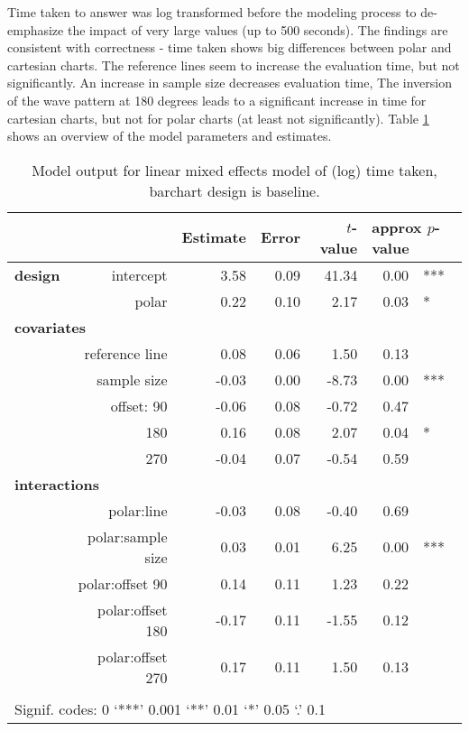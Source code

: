Time taken to answer was log transformed before the modeling process to de-emphasize the impact of very large values (up to 500 seconds). The findings are consistent with correctness - time taken shows big differences between polar and cartesian charts. 
The reference lines seem to increase the evaluation time, but not significantly. An increase in sample size decreases evaluation time, The inversion of the wave pattern at 180 degrees leads to a significant increase in time for cartesian charts, but not for polar charts (at least not significantly). Table \ref{tbl:time} shows an overview of the model parameters and estimates.

\begin{table}[ht]
\begin{center}
\resizebox{\linewidth}{!} {
\begin{tabular}{lrrrrrl}
  \hline
& & Estimate & Error & $t$-value & \multicolumn{2}{l}{approx $p$-value} \\   \hline
\bf design & intercept & 3.58 & 0.09 & 41.34 & 0.00 & ***\\ 
&  polar & 0.22 & 0.10 & 2.17 & 0.03 & * \\ [2pt]
\multicolumn{2}{l}{\bf covariates}\\
&reference line & 0.08 & 0.06 & 1.50 & 0.13 \\ [1pt]
 & sample size & -0.03 & 0.00 & -8.73 & 0.00 & ***\\ [1pt]
&  offset: 90 & -0.06 & 0.08 & -0.72 & 0.47 \\ 
& 180 & 0.16 & 0.08 & 2.07 & 0.04 & *\\ 
&  270 & -0.04 & 0.07 & -0.54 & 0.59 \\ [2pt]
\multicolumn{2}{l}{\bf interactions}\\
&  polar:line & -0.03 & 0.08 & -0.40 & 0.69 \\ [1pt]
&    polar:sample size & 0.03 & 0.01 & 6.25 & 0.00 & ***\\ [1pt]
&    polar:offset 90 & 0.14 & 0.11 & 1.23 & 0.22 \\ 
&    polar:offset 180 & -0.17 & 0.11 & -1.55 & 0.12 \\ 
&    polar:offset 270 & 0.17 & 0.11 & 1.50 & 0.13 \\ 
   \hline
\\[-5pt]
   \multicolumn{5}{l}{Signif. codes:  0 `***' 0.001 `**' 0.01 `*' 0.05 `.' 0.1}
\end{tabular}}
\end{center}
\vspace{-0.2in}
\caption{\label{tbl:time} Model output for linear mixed effects model of (log) time taken, barchart design is baseline. }
\end{table}

